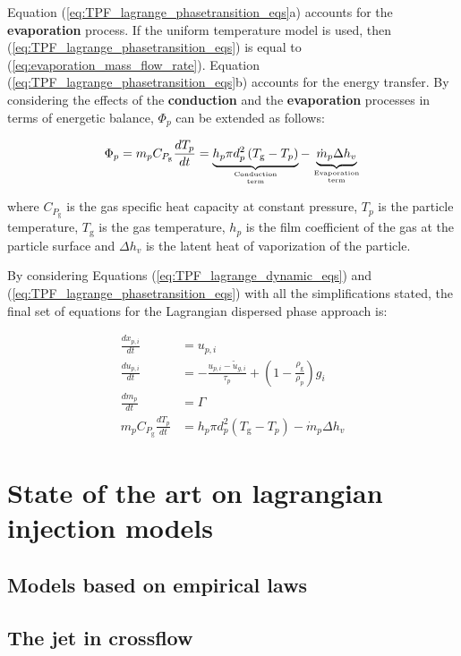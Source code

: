 Equation (\ref{eq:TPF_lagrange_phasetransition_eqs}a) accounts for the \textbf{evaporation} process. If the uniform temperature model is used, then (\ref{eq:TPF_lagrange_phasetransition_eqs}) is equal to (\ref{eq:evaporation_mass_flow_rate}). Equation (\ref{eq:TPF_lagrange_phasetransition_eqs}b) accounts for the energy transfer. By considering the effects of the \textbf{conduction} and the \textbf{evaporation} processes in terms of energetic balance, $\Phi_p$ can be extended as follows:

\begin{equation}
\Phi_p = m_p C_{P_\mathrm{g}} \frac{d T_p}{d t} = \underbrace{ h_p \pi d_p^2 \left( T_\mathrm{g} - T_p \right) }_{\text{Conduction}\atop\text{term}} - \underbrace{ \dot{m}_p  \Delta h_v }_{\text{Evaporation}\atop\text{term}}
\end{equation}

where $C_{P_\mathrm{g}}$ is the gas specific heat capacity at constant pressure, $T_p$ is the particle temperature, $T_\mathrm{g}$ is the gas temperature, $h_p$ is the film coefficient of the gas at the particle surface and $\Delta h_v$ is the latent heat of vaporization of the particle. 

By considering Equations (\ref{eq:TPF_lagrange_dynamic_eqs}) and (\ref{eq:TPF_lagrange_phasetransition_eqs}) with all the simplifications stated, the final set of equations for the Lagrangian dispersed phase approach is:

\begin{subequations}
\begin{align}
\frac{d x_{p,i}}{d t} &= u_{p,i} \\
\frac{d u_{p,i}}{d t} &= - \frac{u_{p,i} - \widetilde{u}_{g,i} }{\tau_p} + \left( 1 - \frac{\rho_\mathrm{g}}{\rho_p} \right) g_i \\
\frac{d m_p}{d t} &= \Gamma \\
m_p C_{P_\mathrm{g}} \frac{d T_p}{d t} &= h_p \pi d_p^2 \left( T_\mathrm{g} - T_p \right) - \dot{m}_p  \Delta h_v
\end{align}
\end{subequations}

\section{State of the art on lagrangian injection models}
\label{sec:ch3_state_art_lagrangian_injection}

\subsection{Models based on empirical laws}

\subsection{The jet in crossflow}
